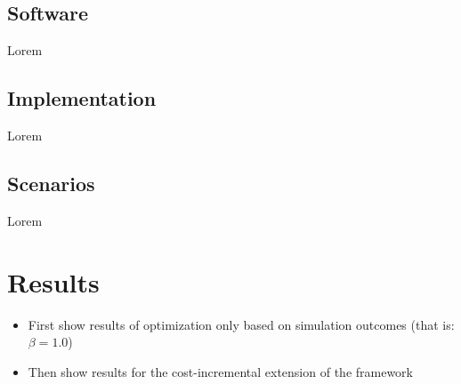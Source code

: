 \subsection{Software}
\label{sec:software}

Lorem

\subsection{Implementation}
\label{sec:implementation}

Lorem

\subsection{Scenarios}
\label{sec:scenarios}

Lorem

\vspace{12pt}
\noindent{}

\section{Results}
\label{sec:results}

\begin{itemize}
	\item First show results of optimization only based on simulation outcomes (that is: $\beta = 1.0$)
	\item Then show results for the cost-incremental extension of the framework
\end{itemize}


